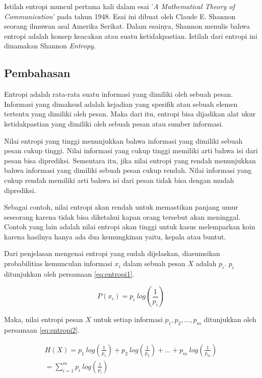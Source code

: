 Istilah entropi muncul pertama kali dalam esai '\textit{A Mathematical Theory of Communication}' pada tahun 1948. Esai ini dibuat oleh Claude E. Shannon seorang ilmuwan asal Amerika Serikat. Dalam esainya, Shannon menulis bahwa entropi adalah konsep keacakan atau suatu ketidakpastian\cite{shannon1948mathematical}. Istilah dari entropi ini dinamakan Shannon \textit{Entropy}.

\subsection{Pembahasan}

Entropi adalah rata-rata suatu informasi yang dimiliki oleh sebuah pesan. Informasi yang dimaksud adalah kejadian yang spesifik atau sebuah elemen tertentu yang dimiliki oleh pesan. Maka dari itu, entropi bisa dijadikan alat ukur ketidakpastian yang dimiliki oleh sebuah pesan atau sumber informasi.

Nilai entropi yang tinggi menunjukkan bahwa informasi yang dimiliki sebuah pesan cukup tinggi. Nilai informasi yang cukup tinggi memiliki arti bahwa isi dari pesan bisa diprediksi. Sementara itu, jika nilai entropi yang rendah menunjukkan bahwa informasi yang dimiliki sebuah pesan cukup rendah. Nilai informasi yang cukup rendah memiliki arti bahwa isi dari pesan tidak bisa dengan mudah diprediksi.

Sebagai contoh, nilai entropi akan rendah untuk memastikan panjang umur seseorang karena tidak bisa diketahui kapan orang tersebut akan meninggal. Contoh yang lain adalah nilai entropi akan tinggi untuk kasus melemparkan koin karena hasilnya hanya ada dua kemungkinan yaitu, kepala atau buntut.

Dari penjelasan mengenai entropi yang sudah dijelaskan, diasumsikan probabilitias kemunculan informasi \begin{math}x_i\end{math} dalam sebuah pesan \begin{math}X\end{math} adalah \begin{math}p_i\end{math}. \begin{math}p_i\end{math} ditunjukkan oleh persamaan \ref{eq:entropi1}.

\begin{equation}
	P(x_i) = p_i\: log(\frac{1}{p_i})
	\label{eq:entropi1}
\end{equation}

Maka, nilai entropi pesan \begin{math}X\end{math} untuk setiap informasi \begin{math}p_1, p_2, ..., p_m\end{math} ditunjukkan oleh persamaan \ref{eq:entropi2}.

\begin{gather}
	H(X) = p_1\: log(\frac{1}{p_1}) + p_2\: log(\frac{1}{p_2}) + ... + p_m\: log(\frac{1}{p_m}) \nonumber \\
	 = \sum\limits_{i=1}^m p_i\: log(\frac{1}{p_i})
	\label{eq:entropi2}
\end{gather}